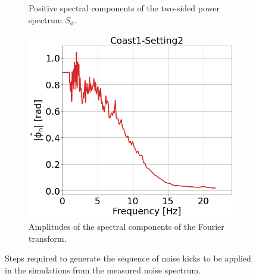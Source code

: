\begin{figure}[!ht]
\begin{subfigure}[t]{0.42\textwidth}
        \caption{Positive spectral components of the two-sided power spectrum $S_\phi$.}
        \label{fig:coast1_setting2_d}
    \end{subfigure}
    \hfill
    \centering
    \begin{subfigure}[t]{0.42\textwidth}
        \includegraphics[width=1\textwidth]{./images/app_B/coast1_setting2_yn_fft.png}
        \caption{Amplitudes of the spectral components of the Fourier transform. %
        }
        \label{fig:coast1_setting2_e}
    \end{subfigure}
    \hfill
    \hfill
    \caption{Steps required to generate the sequence of noise kicks to be applied in the simulations from the measured noise spectrum.}
    \label{fig:noise_kick_generation}
\end{figure}


